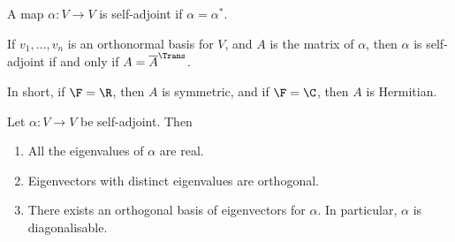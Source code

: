 \begin{definition}
	A map $\alpha:V\to V$ is self-adjoint if $\alpha=\alpha^*$. 
\end{definition}


If $v_1,\ldots,v_n$ is an orthonormal basis for $V$, and $A$ is the matrix of $\alpha$, then $\alpha$ is self-adjoint if and only if $A=\overline{A}^\Trans$. %
	
In short, if $\F=\R$, then $A$ is symmetric, and if $\F=\C$, then $A$ is Hermitian.

\begin{theorem}
	Let $\alpha:V\to V$ be self-adjoint. Then %
	\begin{enumerate}
		\shortskip
		\item All the eigenvalues of $\alpha$ are real.
		\item Eigenvectors with distinct eigenvalues are orthogonal.
		\item There exists an orthogonal basis of eigenvectors for $\alpha$. In particular, $\alpha$ is diagonalisable. %
	\end{enumerate}
\end{theorem}

	\pagebreak

\vspace{-3pt}

